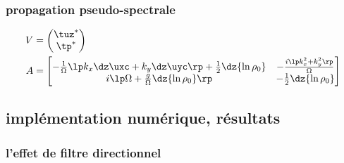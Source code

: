 \documentclass[c]{beamer}
\begin{document}
\begin{frame}
\frametitle{propagation pseudo-spectrale}
\begin{align}
V & =
\begin{pmatrix}
    \tuz^* \notag \\
    \tp^*  \notag
\end{pmatrix} \\
A & =
\begin{bmatrix}
    -\frac{1}{\Omega} \lp k_x \dz \uxc + k_y \dz \uyc \rp + \frac{1}{2} \dz{\ln{\rho_0}} & -\frac{i \lp k_x^2 + k_y^2 \rp}{\Omega}   \\
    i \lp \Omega + \frac{g}{\Omega} \dz{\ln{\rho_0}} \rp                                  & -\frac{1}{2} \dz{\ln{\rho_0}}             \notag
\end{bmatrix}
\end{align}
\end{frame}

\subsection{implémentation numérique, résultats}



\begin{frame}
\frametitle{l'effet de filtre directionnel}
\begin{figure}[!ht]
\centering
{}
\\
\end{figure}
\end{frame}
\end{document}
